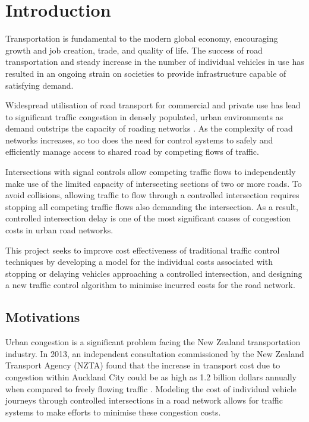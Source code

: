 \chapter{Introduction}

Transportation is fundamental to the modern global economy, encouraging growth and job creation, trade, and quality of life. The success of road transportation and steady increase in the number of individual vehicles in use has resulted in an ongoing strain on societies to provide infrastructure capable of satisfying demand. 

Widespread utilisation of road transport for commercial and private use has lead to significant traffic congestion in densely populated, urban environments as demand outstrips the capacity of roading networks \cite{euro2011whitepaper}. As the complexity of road networks increases, so too does the need for control systems to safely and efficiently manage access to shared road by competing flows of traffic. 

Intersections with signal controls allow competing traffic flows to independently make use of the limited capacity of intersecting sections of  two or more roads. To avoid collisions, allowing traffic to flow through a controlled intersection requires stopping all competing traffic flows also demanding the intersection. As a result, controlled intersection delay is one of the most significant causes of congestion costs in urban road networks.

This project seeks to improve cost effectiveness of traditional traffic control techniques by developing a model for the individual costs associated with stopping or delaying vehicles approaching a controlled intersection, and designing a new traffic control algorithm to minimise incurred costs for the road network.

\section {Motivations}

Urban congestion is a significant problem facing the New Zealand transportation industry. In 2013, an independent consultation commissioned by the New Zealand Transport Agency (NZTA) found that the increase in transport cost due to congestion within Auckland City could be as high as 1.2 billion dollars annually when compared to freely flowing traffic \cite{wallis2013costs}. Modeling the cost of individual vehicle journeys through controlled intersections in a road network allows for traffic systems to make efforts to minimise these congestion costs.

